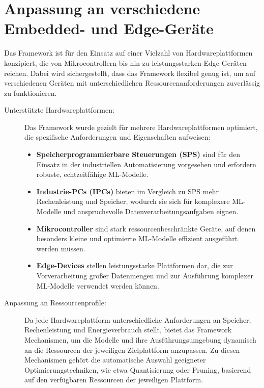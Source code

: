 \section{Anpassung an verschiedene Embedded- und Edge-Geräte}

Das Framework ist für den Einsatz auf einer Vielzahl von Hardwareplattformen konzipiert, die von Mikrocontrollern bis hin zu leistungsstarken Edge-Geräten reichen. 
Dabei wird sichergestellt, dass das Framework flexibel genug ist, um auf verschiedenen Geräten mit unterschiedlichen Ressourcenanforderungen zuverlässig zu funktionieren.

\begin{description}
    \item[Unterstützte Hardwareplattformen:] Das Framework wurde gezielt für mehrere Hardwareplattformen optimiert, die spezifische Anforderungen und Eigenschaften aufweisen:
    \begin{itemize}
        \item \textbf{Speicherprogrammierbare Steuerungen (SPS)} sind für den Einsatz in der industriellen Automatisierung vorgesehen und erfordern robuste, echtzeitfähige ML-Modelle.
        \item \textbf{Industrie-PCs (IPCs)} bieten im Vergleich zu SPS mehr Rechenleistung und Speicher, wodurch sie sich für komplexere ML-Modelle und anspruchsvolle 
        Datenverarbeitungsaufgaben eignen.
        \item \textbf{Mikrocontroller} sind stark ressourcenbeschränkte Geräte, auf denen besonders kleine und optimierte ML-Modelle effizient ausgeführt werden müssen.
        \item \textbf{Edge-Devices} stellen leistungsstarke Plattformen dar, die zur Vorverarbeitung großer Datenmengen und zur Ausführung komplexer ML-Modelle verwendet werden können.
    \end{itemize}

    \item[Anpassung an Ressourcenprofile:] Da jede Hardwareplattform unterschiedliche Anforderungen an Speicher, Rechenleistung und Energieverbrauch stellt, bietet das 
    Framework Mechanismen, um die Modelle und ihre Ausführungsumgebung dynamisch an die Ressourcen der jeweiligen Zielplattform anzupassen. Zu diesen Mechanismen gehört die 
    automatische Auswahl geeigneter Optimierungstechniken, wie etwa Quantisierung oder Pruning, basierend auf den verfügbaren Ressourcen der jeweiligen Plattform.
\end{description}


